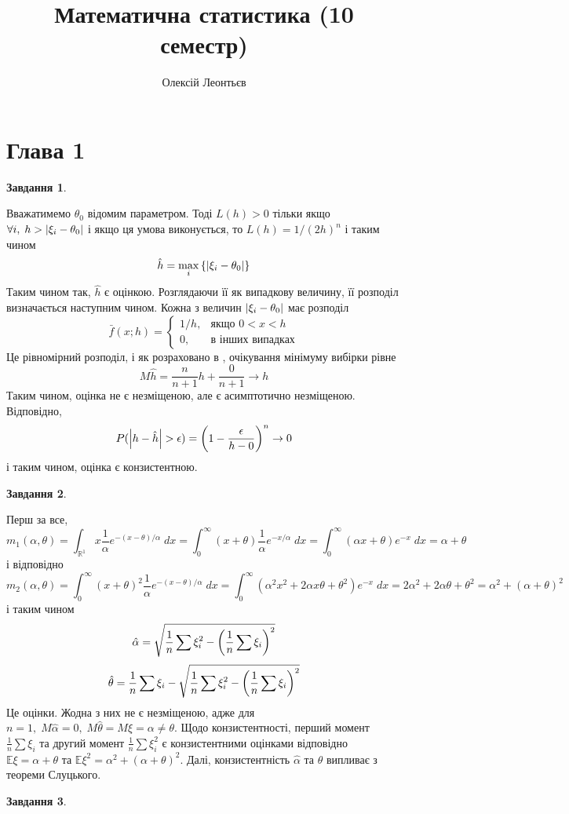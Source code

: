 \documentclass[12pt]{article} %
\title{Математична статистика (10 семестр)}
\author{Олексій Леонтьєв}
\newtheorem{prob}{Завдання}
\newcommand{\dx}{\;dx}
\begin{document}
\maketitle
\section{Глава 1}
\setcounter{prob}{30}
\begin{prob}\end{prob}
	Вважатимемо $\theta_0$ відомим параметром. Тоді $L(h)>0$ тільки якщо $\forall i,\;h>\left|\xi_i-\theta_0\right|$ і якщо ця
	умова виконується, то $L(h)=1/(2h)^n$ і таким чином
	\[\hat{h}=\max_i\mycbra{\myabs{\xi_i-\theta_0}}\]
	Таким чином так, $\hat{h}$ є оцінкою. Розглядаючи її як випадкову величину, її розподіл визначається наступним чином.
	Кожна з величин $\left|\xi_i-\theta_0\right|$ має розподіл
	\[\bar{f}(x;h)=\begin{cases}
		1/h,&\mbox{якщо }0<x<h\\
		0,&\mbox{в інших випадках}
	\end{cases}\]
	Це рівномірний розподіл, і як розраховано в \cite{turchin}, очікування мінімуму вибірки рівне
	\[M\hat{h}=\frac{n}{n+1}h+\frac{0}{n+1}\to h\]
	Таким чином, оцінка не є незміщеною, але є асимптотично незміщеною.
	Відповідно,
	\[P(\myabs{h-\hat{h}}>\epsilon)=\mybra{1-\frac{\epsilon}{h-0}}^n\to0\]
	і таким чином, оцінка є конзистентною.
\begin{prob}\end{prob}
	Перш за все, 
	\[m_1(\alpha,\theta)=\int_{\mathbb{R}^1} x\frac{1}{\alpha}e^{-(x-\theta)/\alpha}\dx=\int_0^\infty(x+\theta)\frac{1}{\alpha}
	e^{-x/\alpha}\dx=\int_0^\infty(\alpha x+\theta)e^{-x}\dx=\alpha+\theta\]
	і відповідно
	\[m_2(\alpha,\theta)=\int_0^\infty (x+\theta)^2\frac{1}{\alpha}e^{-(x-\theta)/\alpha}\dx=
	\int_0^\infty(\alpha^2x^2+2\alpha x\theta+\theta^2)e^{-x}\dx=2\alpha^2+2\alpha\theta+\theta^2=\alpha^2+(\alpha+\theta)^2\]
	і таким чином
	\[\hat{\alpha}=\sqrt{\frac{1}{n}\sum\xi_i^2-\mybra{\frac{1}{n}\sum\xi_i}^2}\]
	\[\hat{\theta}=\frac{1}{n}\sum\xi_i-\sqrt{\frac{1}{n}\sum\xi_i^2-\mybra{\frac{1}{n}\sum\xi_i}^2}\]
	Це оцінки. Жодна з них не є незміщеною, адже для $n=1,\;M\hat{\alpha}=0,\;M\hat{\theta}=M\xi=\alpha\neq\theta$. Щодо
	конзистентності, перший момент $\frac{1}{n}\sum\xi_i$ та другий момент $\frac{1}{n}\sum\xi_i^2$ є конзистентними
	оцінками відповідно $\mathbb{E}\xi=\alpha+\theta$ та $\mathbb{E}\xi^2=\alpha^2+(\alpha+\theta)^2$. Далі, конзистентність
	$\hat{\alpha}$ та $\hat{\theta}$ випливає з теореми Слуцького.
\begin{prob}\end{prob}
\end{document}
